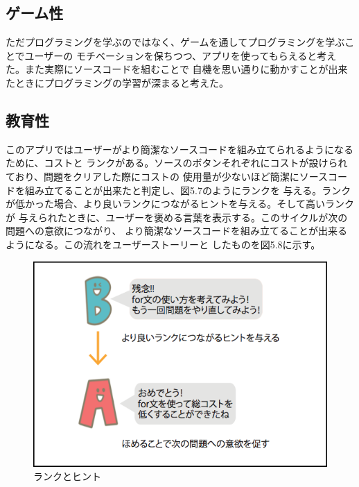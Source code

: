 \documentclass[openany,11pt,papersize]{jsbook}
\begin{document}

\subsection{ゲーム性}
ただプログラミングを学ぶのではなく、ゲームを通してプログラミングを学ぶことでユーザーの
モチベーションを保ちつつ、アプリを使ってもらえると考えた。また実際にソースコードを組むことで
自機を思い通りに動かすことが出来たときにプログラミングの学習が深まると考えた。
 


\subsection{教育性}
このアプリではユーザーがより簡潔なソースコードを組み立てられるようになるために、コストと
ランクがある。ソースのボタンそれぞれにコストが設けられており、問題をクリアした際にコストの
使用量が少ないほど簡潔にソースコードを組み立てることが出来たと判定し、図5.7のようにランクを
与える。ランクが低かった場合、より良いランクにつながるヒントを与える。そして高いランクが
与えられたときに、ユーザーを褒める言葉を表示する。このサイクルが次の問題への意欲につながり、
より簡潔なソースコードを組み立てることが出来るようになる。この流れをユーザーストーリーと
したものを図5.8に示す。

\begin{figure}[H]
\begin{center}
\includegraphics[width=12cm, bb=0 0 538 376]{img/4thParagraph/cost.png}
\end{center}
\caption{ランクとヒント}
\end{figure}
\end{document}
